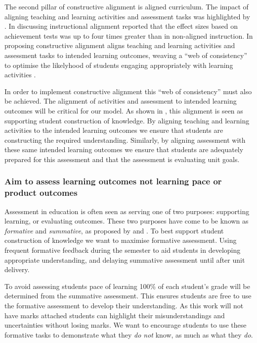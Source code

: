 The second pillar of constructive alignment is aligned curriculum. The impact of aligning teaching and learning activities and assessment tasks was highlighted by \citet{Cohen:1987}. In discussing instructional alignment \citet{Cohen:1987} reported that the effect sizes based on achievement tests was up to four times greater than in non-aligned instruction. In proposing constructive alignment \citet{Biggs:1996c} aligns teaching and learning activities and assessment tasks to intended learning outcomes, weaving a ``web of consistency'' to optimise the likelyhood of students engaging appropriately with learning activities \cite{Biggs:1999}. 

In order to implement constructive alignment this ``web of consistency'' must also be achieved. The alignment of activities and assessment to intended learning outcomes will be critical for our model. As shown in , this alignment is seen as supporting student construction of knowledge. By aligning teaching and learning activities to the intended learning outcomes we ensure that students are constructing the required understanding. Similarly, by aligning assessment with these same intended learning outcomes we ensure that students are adequately prepared for this assessment and that the assessment is evaluating unit goals. 



\subsubsection{Aim to assess learning outcomes not learning pace or product outcomes} %
\label{ssub:aim_to_assess_learning_outcomes_not_learning_pace_or_product_outcomes_}

Assessment in education is often seen as serving one of two purposes: supporting learning, or evaluating outcomes. These two purposes have come to be known as \emph{formative} and \emph{summative}, as proposed by \citet{Scriven:1967} and \citet{Bloom:1969}. To best support student construction of knowledge we want to maximise formative assessment. Using frequent formative feedback during the semester to aid students in developing appropriate understanding, and delaying summative assessment until after unit delivery.

To avoid assessing students pace of learning 100\% of each student's grade will be determined from the summative assessment. This ensures students are free to use the formative assessment to develop their understanding. As this work will not have marks attached students can highlight their misunderstandings and uncertainties without losing marks. We want to encourage students to use these formative tasks to demonstrate what they \emph{do not} know, as much as what they \emph{do}. 

